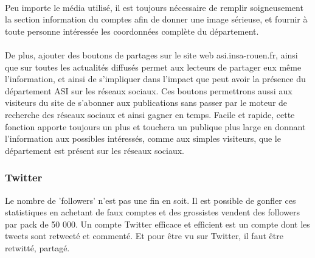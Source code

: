 \paragraph{}
Peu importe le média utilisé, il est toujours nécessaire de remplir soigneusement la section information du comptes afin de donner une image sérieuse, et fournir à toute personne intéressée les coordonnées complète du département.
\paragraph{}
De plus, ajouter des boutons de partages sur le site web asi.insa-rouen.fr, ainsi que sur toutes les actualités diffusés permet aux lecteurs de partager eux même l'information, et ainsi de s'impliquer dans l'impact que peut avoir la présence du département ASI sur les réseaux sociaux. Ces boutons permettrons aussi aux visiteurs du site de s'abonner aux publications sans passer par le moteur de recherche des réseaux sociaux et ainsi gagner en temps. Facile et rapide, cette fonction apporte toujours un plus et touchera un publique plus large en donnant l'information aux possibles intéressés, comme aux simples visiteurs, que le département est présent sur les réseaux sociaux.
\subsubsection{Twitter}
Le nombre de 'followers' n'est pas une fin en soit. Il est possible de gonfler ces statistiques en achetant de faux comptes et des grossistes vendent des followers par pack de 50 000. Un compte Twitter efficace et efficient est un compte dont les tweets sont retweeté et commenté. Et pour être vu sur Twitter, il faut être retwitté, partagé.
